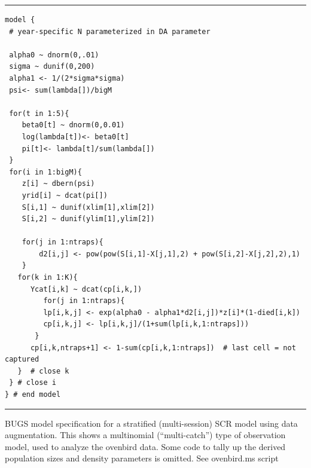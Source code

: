 \begin{panel}[ht]
\renewcommand{\baselinestretch}{1.0}
\centering
\rule[0.15in]{\textwidth}{.03in}
{\small
\begin{verbatim}
model {
 # year-specific N parameterized in DA parameter 

 alpha0 ~ dnorm(0,.01)
 sigma ~ dunif(0,200)
 alpha1 <- 1/(2*sigma*sigma)
 psi<- sum(lambda[])/bigM

 for(t in 1:5){
    beta0[t] ~ dnorm(0,0.01)   
    log(lambda[t])<- beta0[t]
    pi[t]<- lambda[t]/sum(lambda[])
 } 
 for(i in 1:bigM){
    z[i] ~ dbern(psi)
    yrid[i] ~ dcat(pi[])
    S[i,1] ~ dunif(xlim[1],xlim[2])
    S[i,2] ~ dunif(ylim[1],ylim[2])

    for(j in 1:ntraps){
        d2[i,j] <- pow(pow(S[i,1]-X[j,1],2) + pow(S[i,2]-X[j,2],2),1)
    }
   for(k in 1:K){
      Ycat[i,k] ~ dcat(cp[i,k,])
         for(j in 1:ntraps){
         lp[i,k,j] <- exp(alpha0 - alpha1*d2[i,j])*z[i]*(1-died[i,k])        
         cp[i,k,j] <- lp[i,k,j]/(1+sum(lp[i,k,1:ntraps]))
       }
      cp[i,k,ntraps+1] <- 1-sum(cp[i,k,1:ntraps])  # last cell = not captured
   }  # close k
 } # close i
} # end model
\end{verbatim}
}
\rule[-0.15in]{\textwidth}{.03in}
\caption{BUGS model specification for a stratified (multi-session) SCR
  model using data augmentation. This shows a multinomial
  (``multi-catch'') type of observation model, used to analyze the
  ovenbird data.  Some code to tally up the derived population sizes
  and density parameters is omitted. See ovenbird.ms script }
\label{multisession.panel.ovenbird}
\end{panel}

